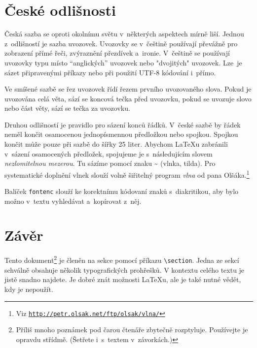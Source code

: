 \documentclass[a4paper, 10pt, twocolumn]{article}
\begin{document}
\section{České odlišnosti}
Česká sazba se oproti okolnímu světu v~některých aspektech mírně liší. Jednou z~odlišností je sazba uvozovek. Uvozovky se v~češtině používají převážně pro zobrazení přímé řeči, zvýraznění přezdívek a~ironie. V~češtině se používají uvozovky typu  místo ``anglických'' uvozovek nebo "dvojitých" uvozovek. Lze~je sázet připravenými příkazy nebo při použití UTF-8 kódování i~přímo.
\par
Ve smíšené sazbě se řez uvozovek řídí řezem prvního uvozovaného slova. Pokud je uvozována celá věta, sází se koncová tečka před uvozovku, pokud se uvozuje slovo nebo část věty, sází se tečka za uvozovku.
\par
Druhou odlišností je pravidlo pro sázení konců řádků. V~české sazbě by řádek neměl končit osamocenou jednopísmennou předložkou nebo spojkou. Spojkou  končit může pouze při sazbě do šířky 25 liter. Abychom \LaTeX u zabránili v~sázení osamocených předložek, spojujeme je s~následujícím slovem \emph{nezlomitelnou mezerou}. Tu sázíme pomocí znaku \textasciitilde{} (vlnka, tilda). Pro systematické doplnění vlnek slouží volně šiřitelný program \emph{vlna} od pana Olšáka.\footnote{Viz \href{http://petr.olsak.net/ftp/olsak/vlna/}{\texttt{http://petr.olsak.net/ftp/olsak/vlna/}}}
\par
Balíček \texttt{fontenc} slouží ke korektnímu kódovaní znaků s~diakritikou, aby bylo možno v~textu vyhledávat a~kopírovat z~něj.
\section{Závěr}
Tento dokument\footnote{Příliš mnoho poznámek pod čarou čtenáře zbytečně rozptyluje. Používejte je opravdu střídmě. (Šetřete i~s~textem v~závorkách.)} je členěn na sekce pomocí příkazu \verb|\section|. Jedna ze sekcí schválně obsahuje několik typografických prohřešků. V kontextu celého textu je jistě snadno najdete. Je dobré znát možnosti \LaTeX u, ale je také nutné vědět, kdy je nepoužít.
\end{document}
